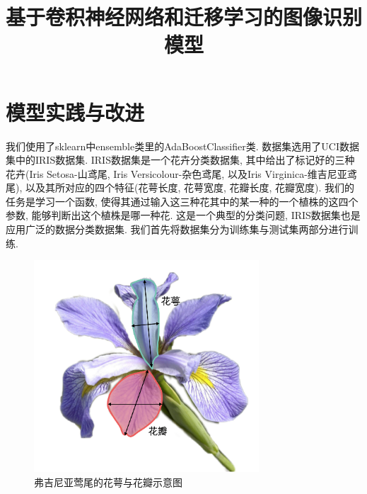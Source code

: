 \documentclass[lang=cn,11pt]{elegantpaper}
\title{基于卷积神经网络和迁移学习的图像识别模型}
\date{}
\begin{document}
\newpage
\maketitle

\vspace{-25pt}
\begin{abstract}



\end{abstract}
\keywords{}
	
\tableofcontents
\thispagestyle{empty}
\newpage
\normalsize
{}


\section{模型实践与改进}

我们使用了sklearn中ensemble类里的AdaBoostClassifier类. 数据集选用了UCI数据集中的IRIS数据集. IRIS数据集是一个花卉分类数据集, 其中给出了标记好的三种花卉(Iris Setosa-山鸢尾, Iris Versicolour-杂色鸢尾, 以及Iris Virginica-维吉尼亚鸢尾), 以及其所对应的四个特征(花萼长度, 花萼宽度, 花瓣长度, 花瓣宽度). 我们的任务是学习一个函数, 使得其通过输入这三种花其中的某一种的一个植株的这四个参数, 能够判断出这个植株是哪一种花. 这是一个典型的分类问题, IRIS数据集也是应用广泛的数据分类数据集. 我们首先将数据集分为训练集与测试集两部分进行训练.

\begin{figure}[hbt]
\centering
  \includegraphics[width=0.75\textwidth]{flower.png}
  \caption{弗吉尼亚莺尾的花萼与花瓣示意图\label{fig:VGflower}}
\end{figure}
\end{document}
